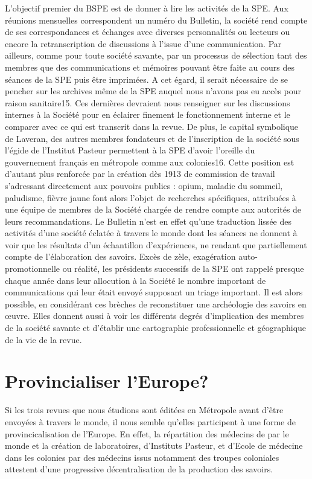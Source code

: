 L’objectif premier du BSPE est de donner à lire les activités de la SPE. Aux réunions mensuelles correspondent un numéro du Bulletin, la société rend compte de ses correspondances et échanges avec diverses personnalités ou lecteurs ou encore la retranscription de discussions à l’issue d’une communication. Par ailleurs, comme pour toute société savante, par un processus de sélection tant des membres que des communications et mémoires pouvant être faite au cours des séances de la SPE puis être imprimées. A cet égard, il serait nécessaire de se pencher sur les archives même de la SPE auquel nous n’avons pas eu accès pour raison sanitaire15. Ces dernières devraient nous renseigner sur les discussions internes à la Société pour en éclairer finement le fonctionnement interne et le comparer avec ce qui est transcrit dans la revue.
De plus, le capital symbolique de Laveran, des autres membres fondateurs et de l’inscription de la société sous l’égide de l’Institut Pasteur permettent à la SPE d’avoir l’oreille du gouvernement français en métropole comme aux colonies16. Cette position est d’autant plus renforcée par la création dès 1913 de commission de travail s’adressant directement aux pouvoirs publics : opium, maladie du sommeil, paludisme, fièvre jaune font alors l’objet de recherches spécifiques, attribuées à une équipe de membres de la Société chargée de rendre compte aux autorités de leurs recommandations.
Le Bulletin n’est en effet qu’une traduction lissée des activités d’une société éclatée à travers le monde dont les séances ne donnent à voir que les résultats d’un échantillon d’expériences, ne rendant que partiellement compte de l’élaboration des savoirs. Excès de zèle, exagération auto-promotionnelle ou réalité, les présidents successifs de la SPE ont rappelé presque chaque année dans leur allocution à la Société le nombre important de communications qui leur était envoyé supposant un triage important. Il est alors possible, en considérant ces brèches de reconstituer une archéologie des savoirs en œuvre. Elles donnent aussi à voir les différents degrés d’implication des membres de la société savante et d’établir une cartographie professionnelle et géographique de la vie de la revue.



\section{Provincialiser l’Europe?}

Si les trois revues que nous étudions sont éditées en Métropole avant d'être envoyées à travers le monde, il nous semble qu'elles participent à une forme de provincicalisation de l'Europe. En effet, la répartition des médecins de par le monde et la création de laboratoires, d'Instituts Pasteur, et d'Ecole de médecine dans les colonies par des médecins issus notamment des troupes coloniales attestent d'une progressive décentralisation de la production des savoirs. 

